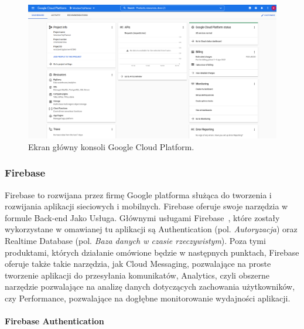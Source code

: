     \vspace{1cm}
    \begin{figure}[!ht]%
        \centering
        \includegraphics[scale=0.28]{src/gcp console.png}
        \caption{Ekran główny konsoli Google Cloud Platform.\label{gcp_console}}
        \qquad
    \end{figure} 

\newpage
        \subsubsection{Firebase}
        Firebase to rozwijana przez firmę Google platforma służąca do tworzenia i rozwijania aplikacji sieciowych i mobilnych. Firebase oferuje swoje narzędzia w formule
        Back-end Jako Usługa. Głównymi usługami Firebase~\cite{FIREBASE_BUILD}, które zostały wykorzystane w omawianej tu aplikacji są Authentication (pol. \emph{Autoryzacja}) oraz Realtime 
        Database (pol. \emph{Baza danych w czasie rzeczywistym}). Poza tymi produktami, których działanie omówione będzie w następnych punktach, Firebase oferuje także takie narzędzia, jak 
        Cloud Messaging, pozwalające na proste tworzenie aplikacji do przesyłania komunikatów, Analytics, czyli obszerne narzędzie pozwalające na analizę danych dotyczących zachowania 
        użytkowników, czy Performance, pozwalające na dogłębne monitorowanie wydajności aplikacji. 

        \paragraph{Firebase Authentication}
        
